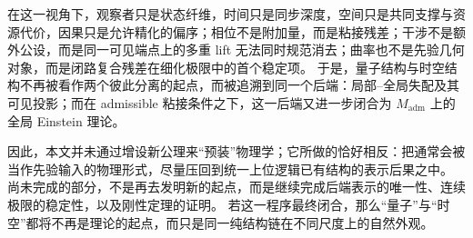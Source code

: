 在这一视角下，观察者只是状态纤维，时间只是同步深度，空间只是共同支撑与资源代价，因果只是允许精化的偏序；相位不是附加量，而是粘接残差；干涉不是额外公设，而是同一可见端点上的多重 lift 无法同时规范消去；曲率也不是先验几何对象，而是闭路复合残差在细化极限中的首个稳定项。
于是，量子结构与时空结构不再被看作两个彼此分离的起点，而被追溯到同一个后端：局部--全局失配及其可见投影；而在 admissible 粘接条件之下，这一后端又进一步闭合为 \(M_{\mathrm{adm}}\) 上的全局 Einstein 理论。

因此，本文并未通过增设新公理来“预装”物理学；它所做的恰好相反：把通常会被当作先验输入的物理形式，尽量压回到统一上位逻辑已有结构的表示后果之中。
尚未完成的部分，不是再去发明新的起点，而是继续完成后端表示的唯一性、连续极限的稳定性，以及刚性定理的证明。
若这一程序最终闭合，那么“量子”与“时空”都将不再是理论的起点，而只是同一纯结构链在不同尺度上的自然外观。
